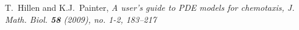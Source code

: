 \documentclass[12pt,reqno]{amsart}
\begin{document}
\begin{thebibliography}{[MT]}












 T.~Hillen and K.J.~Painter, \it A user's guide to PDE models for chemotaxis, \rm J. Math. Biol. {\bf 58} (2009), no. 1-2, 183--217





\end{thebibliography}
\end{document}
